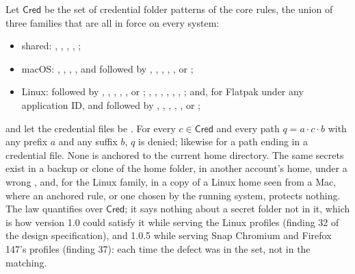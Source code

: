 \begin{law}
\label{law:credential-anywhere}
Let $\mathsf{Cred}$ be the set of credential folder patterns of the core rules,
the union of three families that are all in force on every system:
\begin{itemize}
  \item shared: , , , , ;
  \item macOS: , , ,
        , and  followed by
        , , , ,
        ,  or ;
  \item Linux:  followed by , ,
        , , ,  or
        ; , , ,
        , ,
        , ; and, for Flatpak under any
        application ID,  and 
        followed by , , ,
        , ,  or ;
\end{itemize}
and let the credential files be .  For every $c\in\mathsf{Cred}$ and
every path $q=a\cdot c\cdot b$ with any prefix $a$ and any suffix $b$, $q$ is
denied; likewise for a path ending in a credential file.  None is anchored to the
current home directory.  The same secrets exist in a backup or clone of the home
folder, in another account's home, under a wrong , and, for the Linux
family, in a copy of a Linux home seen from a Mac, where an anchored rule, or one
chosen by the running system, protects nothing.  The law quantifies over
$\mathsf{Cred}$; it says nothing about a secret folder not in it, which is how
version 1.0 could satisfy it while serving the Linux profiles (finding 32 of the
design specification), and 1.0.5 while serving Snap Chromium and Firefox 147's
profiles (finding 37): each time the defect was in the set, not in the matching.
\end{law}


